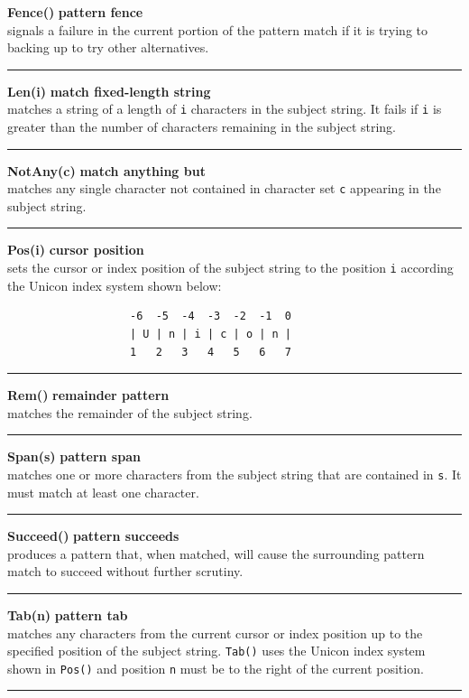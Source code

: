 \documentclass[letterpaper,12pt]{article}
\begin{document}
\noindent\textbf{Fence()} \hfill\textbf{pattern fence}\\
signals a failure in the current portion of the pattern match
if it is trying to backing up to try other alternatives.\\
\noindent\rule{16.5cm}{0.1pt}

\noindent\textbf{Len(i)} \hfill\textbf{match fixed-length string}\\
matches a string of a length of \texttt{i} characters in the subject string.
It fails if \texttt{i} is greater than the number of characters remaining
in the subject string.\\
\noindent\rule{16.5cm}{0.1pt}

\noindent\textbf{NotAny(c)} \hfill\textbf{match anything but}\\
matches any single character not contained in character set \texttt{c}
appearing in the subject string.\\
\noindent\rule{16.5cm}{0.1pt}

\noindent\textbf{Pos(i)} \hfill\textbf{cursor position}\\
sets the cursor or index position of the subject string to
the position \texttt{i} according the Unicon index system shown below:
\begin{verbatim}
                   -6  -5  -4  -3  -2  -1  0
                   | U | n | i | c | o | n |
                   1   2   3   4   5   6   7
\end{verbatim}
\noindent\rule{16.5cm}{0.1pt}

\noindent\textbf{Rem()} \hfill\textbf{remainder pattern}\\
matches the remainder of the subject string.\\
\noindent\rule{16.5cm}{0.1pt}

\noindent\textbf{Span(s)} \hfill\textbf{pattern span}\\
matches one or more characters from the subject string that
are contained in \texttt{s}.  It must match at least one character.\\
\noindent\rule{16.5cm}{0.1pt}

\noindent\textbf{Succeed()} \hfill\textbf{pattern succeeds}\\
produces a pattern that, when matched, will cause the surrounding
pattern match to succeed without further scrutiny.\\
\noindent\rule{16.5cm}{0.1pt}

\noindent\textbf{Tab(n)} \hfill\textbf{pattern tab}\\
matches any characters from the current cursor or index position up to
the specified position of the subject string.  \texttt{Tab()} uses the
Unicon index system shown in \texttt{Pos()} and position \texttt{n} must
be to the right of the current position.\\
\noindent\rule{16.5cm}{0.1pt}
\end{document}

